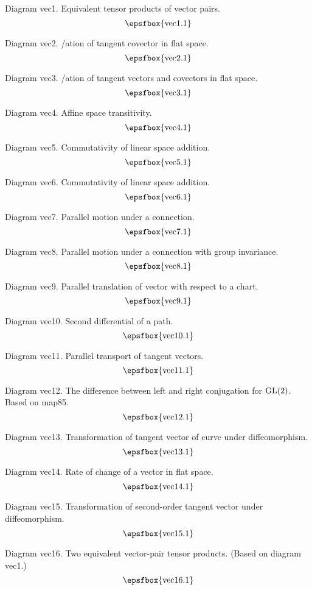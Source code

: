 Diagram vec1. Equivalent tensor products of vector pairs.
$$
\centerline{\epsfbox{vec1.1}}
$$

Diagram vec2. \Visualis/ation of tangent covector in flat space.
$$
\centerline{\epsfbox{vec2.1}}
$$

Diagram vec3. \Visualis/ation of tangent vectors and covectors in flat space.
$$
\centerline{\epsfbox{vec3.1}}
$$

Diagram vec4. Affine space transitivity.
$$
\centerline{\epsfbox{vec4.1}}
$$

Diagram vec5. Commutativity of linear space addition.
$$
\centerline{\epsfbox{vec5.1}}
$$

\filleject

Diagram vec6. Commutativity of linear space addition.
$$
\centerline{\epsfbox{vec6.1}}
$$

Diagram vec7. Parallel motion under a connection.
$$
\centerline{\epsfbox{vec7.1}}
$$

Diagram vec8. Parallel motion under a connection with group invariance.
$$
\centerline{\epsfbox{vec8.1}}
$$

Diagram vec9. Parallel translation of vector with respect to a chart.
$$
\centerline{\epsfbox{vec9.1}}
$$

Diagram vec10. Second differential of a path.
$$
\centerline{\epsfbox{vec10.1}}
$$

\filleject

Diagram vec11. Parallel transport of tangent vectors.
$$
\centerline{\epsfbox{vec11.1}}
$$

Diagram vec12. The difference between left and right conjugation for
$\gp{GL}(2)$. Based on map85.
$$
\centerline{\epsfbox{vec12.1}}
$$

Diagram vec13. Transformation of tangent vector of curve under diffeomorphism.
$$
\centerline{\epsfbox{vec13.1}}
$$

Diagram vec14. Rate of change of a vector in flat space.
$$
\centerline{\epsfbox{vec14.1}}
$$

\filleject

Diagram vec15. Transformation of second-order tangent vector under
diffeomorphism.
$$
\centerline{\epsfbox{vec15.1}}
$$

Diagram vec16. Two equivalent vector-pair tensor products. (Based on diagram
vec1.)
$$
\centerline{\epsfbox{vec16.1}}
$$

